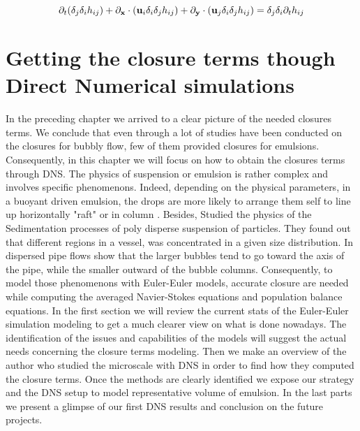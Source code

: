 \begin{equation}
    \partial_t (\delta_j\delta_i h_{ij}) + \partial_\textbf{x} \cdot (\textbf{u}_i \delta_i\delta_j h_{ij}) + \partial_\textbf{y} \cdot (\textbf{u}_j \delta_i\delta_j h_{ij}) = \delta_j\delta_i\partial_t h_{ij}
    \label{eq:delta_beta_delat_alpha_h}
\end{equation}\chapter{Getting the closure terms though Direct Numerical simulations}
\label{chap:DNS}

In the preceding chapter we arrived to a clear picture of the needed closures terms.
We conclude that even through a lot of studies have been conducted on the closures for bubbly flow, few of them provided closures for emulsions.
Consequently, in this chapter we will focus on how to obtain the closures terms through DNS. 
The physics of suspension or emulsion is rather complex and involves specific phenomenons.
Indeed, depending on the physical parameters, in a buoyant driven emulsion, the drops are more likely to arrange them self to line up horizontally "raft" or in column \citep{tryggvason2011direct} \citep{guazzelli2011}. 
Besides, \citet{davis1985sedimentation} Studied the physics of the Sedimentation processes of poly disperse suspension of particles. 
They found out that different regions in a vessel, was concentrated in a given size distribution.
In dispersed pipe flows \citet{morel2010comparison} show that the larger bubbles tend to go toward the axis of the pipe, while the smaller outward of the bubble columns.
Consequently, to model those phenomenons with Euler-Euler models, accurate closure are needed while computing the averaged Navier-Stokes equations and population balance equations.
In the first section we will review the current stats of the Euler-Euler simulation modeling to get a much clearer view on what is done nowadays.
The identification of the issues and capabilities of the models will suggest the actual needs concerning the closure terms modeling.
Then we make an overview of the author who studied the microscale with DNS in order to find how they computed the closure terms.
Once the methods are clearly identified we expose our strategy and the DNS setup to model representative volume of emulsion. 
In the last parts we present a glimpse of our first DNS results and conclusion on the future projects. 

